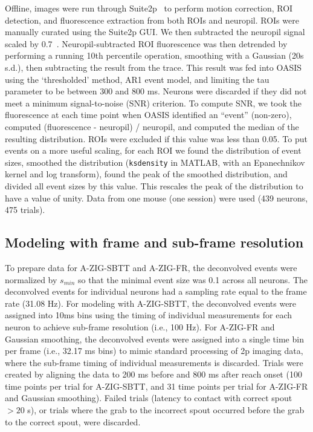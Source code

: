 \documentclass{article}
\begin{document}
Offline, images were run through Suite2p~\cite{pachitariu2017suite2p} to perform motion correction, ROI detection, and fluorescence extraction from both ROIs and neuropil. ROIs were manually curated using the Suite2p GUI. We then subtracted the neuropil signal scaled by 0.7~\cite{chen2013ultrasensitive}. Neuropil-subtracted ROI fluorescence was then detrended by performing a running 10th percentile operation, smoothing with a Gaussian (20s s.d.), then subtracting the result from the trace. This result was fed into OASIS~\cite{friedrich2017fast} using the ‘thresholded’ method, AR1 event model, and limiting the tau parameter to be between 300 and 800 ms. Neurons were discarded if they did not meet a minimum signal-to-noise (SNR) criterion. To compute SNR, we took the fluorescence at each time point when OASIS identified an “event” (non-zero), computed (fluorescence - neuropil) / neuropil, and computed the median of the resulting distribution. ROIs were excluded if this value was less than 0.05. To put events on a more useful scaling, for each ROI we found the distribution of event sizes, smoothed the distribution (\texttt{ksdensity} in MATLAB, with an Epanechnikov kernel and log transform), found the peak of the smoothed distribution, and divided all event sizes by this value. This rescales the peak of the distribution to have a value of unity. Data from one mouse (one session) were used (439 neurons, 475 trials).

\subsection{Modeling with frame and sub-frame resolution}

To prepare data for A-ZIG-SBTT and A-ZIG-FR, the deconvolved events were normalized by $s_{min}$ so that the minimal event size was 0.1 across all neurons. The deconvolved events for individual neurons had a sampling rate equal to the frame rate (31.08 Hz). For modeling with A-ZIG-SBTT, the deconvolved events were assigned into 10ms bins using the timing of individual measurements for each neuron to achieve sub-frame resolution (i.e., 100 Hz). For A-ZIG-FR and Gaussian smoothing, the deconvolved events were assigned into a single time bin per frame (i.e., 32.17 ms bins) to mimic standard processing of 2p imaging data, where the sub-frame timing of individual measurements is discarded. Trials were created by aligning the data to 200 ms before and 800 ms after reach onset (100 time points per trial for A-ZIG-SBTT, and 31 time points per trial for A-ZIG-FR and Gaussian smoothing). Failed trials (latency to contact with correct spout $>20$ s), or trials where the grab to the incorrect spout occurred before the grab to the correct spout, were discarded.
\end{document}
